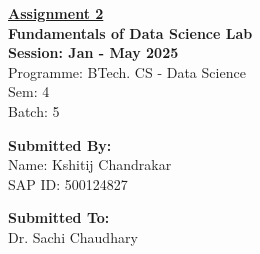 
\begin{titlepage}
\centering
{\Huge \underline{\textbf{Assignment 2}}} \\[0.7cm]
{\Large \textbf{Fundamentals of Data Science Lab}} \\[0.5cm]
{\large \textbf{Session: Jan - May 2025}} \\[0.5cm]  %
{\large Programme: BTech. CS - Data Science} \\[0.5cm]  %
{\large Sem: 4} \\  %
{\large Batch: 5}  %

\vfill
\begin{center}
      \begin{minipage}[t][3cm][t]{0.45\textwidth}  %
        \textbf{Submitted By:} \\[0.15cm]
        Name: Kshitij Chandrakar \\
        SAP ID: 500124827
    \end{minipage}
    \hfill
      \begin{minipage}[t][3cm][t]{0.45\textwidth}  %
        \raggedleft  %
        \textbf{Submitted To:} \\[0.15cm]
        Dr. Sachi Chaudhary
    \end{minipage}
\end{center}
\end{titlepage}
